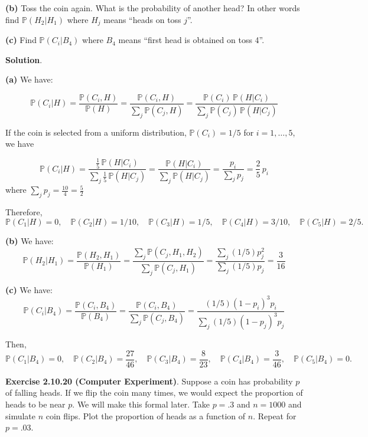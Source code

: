 \textbf{(b)} Toss the coin again. What is the probability of another
head? In other words find \(\mathbb{P}(H_{2} | H_{1})\) where \(H_{j}\) means
``heads on toss \(j\)''.

\textbf{(c)} Find \(\mathbb{P}(C_{i} | B_{4})\) where \(B_{4}\) means ``first head is obtained on toss 4''.

\textbf{Solution}.

\textbf{(a)} We have:

\[
\mathbb{P}(C_{i} | H) 
= \frac{\mathbb{P}(C_{i}, H)}{\mathbb{P}(H)} 
= \frac{\mathbb{P}(C_{i}, H)}{\sum_{j} \mathbb{P}(C_{j}, H)} 
= \frac{\mathbb{P}(C_{i}) \, \mathbb{P}(H | C_{i})}{ \sum_{j} \mathbb{P}(C_{j}) \, \mathbb{P}(H | C_{j})}
\]

If the coin is selected from a uniform distribution, \(\mathbb{P}(C_{i}) = 1/5\) for \(i = 1, \dots, 5\), we have

\[
\mathbb{P}(C_{i} | H)
= \frac{\tfrac{1}{5} \, \mathbb{P}(H | C_{i})}{ \sum_{j} \tfrac{1}{5} \, \mathbb{P}(H | C_{j})}
= \frac{\mathbb{P}(H | C_{i})}{ \sum_{j} \mathbb{P}(H | C_{j})} 
= \frac{p_{i}}{\sum_{j} p_{j}}
= \frac{2}{5} \, p_{i}
\]
where $\sum_{j} p_{j}=\frac{10}{4}=\frac{5}{2}$

Therefore,
\[ 
\mathbb{P}(C_{1} | H) = 0,
\quad
\mathbb{P}(C_{2} | H) = 1/10,
\quad
\mathbb{P}(C_{3} | H) = 1/5,
\quad
\mathbb{P}(C_{4} | H) = 3/10,
\quad
\mathbb{P}(C_{5} | H) = 2/5.
\]

\textbf{(b)} We have:
\[
\mathbb{P}(H_{2} | H_{1}) 
= \frac{\mathbb{P}(H_{2}, H_{1})}{\mathbb{P}(H_{1})} 
= \frac{\sum_{j} \mathbb{P}(C_{j}, H_{1}, H_{2})}{\sum_{j} \mathbb{P}(C_{j}, H_{1})} 
= \frac{\sum_{j} (1/5) p_{j}^{2}}{\sum_{j} (1/5) p_{j}} 
= \frac{3}{16}
\]

\textbf{(c)} We have:
\[
\mathbb{P}(C_{i} | B_{4}) 
= \frac{\mathbb{P}(C_{i}, B_{4})}{\mathbb{P}(B_{4})}
= \frac{\mathbb{P}(C_{i}, B_{4})}{\sum_{j} \mathbb{P}(C_{j}, B_{4})}
= \frac{(1/5) (1 - p_{i})^{3} p_{i}}{\sum_{j} (1/5) (1 - p_{j})^{3} p_{j}}
\]

Then,
\[
\mathbb{P}(C_{1} | B_{4}) = 0,
\quad
\mathbb{P}(C_{2} | B_{4}) = \frac{27}{46},
\quad
\mathbb{P}(C_{3} | B_{4}) = \frac{8}{23},
\quad
\mathbb{P}(C_{4} | B_{4}) = \frac{3}{46},
\quad
\mathbb{P}(C_{5} | B_{4}) = 0.
\]

\textbf{Exercise 2.10.20 (Computer Experiment)}. Suppose a coin has probability \(p\) of falling heads. If we flip the coin many times, we would expect the proportion of heads to be near \(p\). We will make this formal later. Take \(p = .3\) and \(n = 1000\) and simulate \(n\) coin flips. Plot the proportion of heads as a function of \(n\). Repeat for \(p = .03\).

